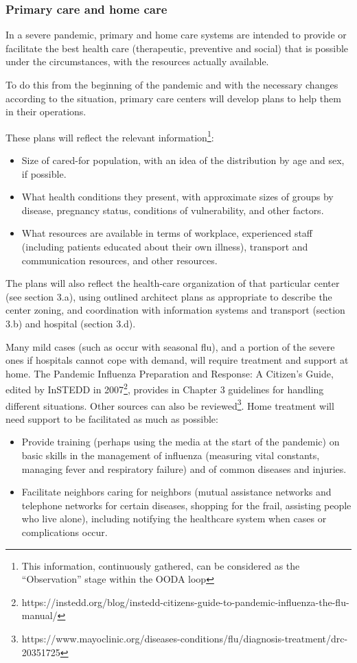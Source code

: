 \documentclass[12pt, a4]{scrartcl}
\begin{document}
\subsubsection{Primary care and home care}
In a severe pandemic, primary and home care systems are intended to provide or facilitate the best health care (therapeutic, preventive and social) that is possible under the circumstances, with the resources actually available.

To do this from the beginning of the pandemic and with the necessary changes according to the situation, primary care centers will develop plans to help them in their operations.

These plans will reflect the relevant information\footnote{This information, continuously gathered, can be considered as the “Observation” stage within the OODA loop}:
\begin{itemize}
	\item Size of cared-for population, with an idea of the distribution by age and sex, if possible.
	\item What health conditions they present, with approximate sizes of groups by disease, pregnancy status, conditions of vulnerability, and other factors.
	\item What resources are available in terms of workplace, experienced staff (including patients educated about their own illness), transport and communication resources, and other resources. 
\end{itemize}

The plans will also reflect the health-care organization of that particular center (see section 3.a), using outlined architect plans as appropriate to describe the center zoning, and coordination with information systems and transport (section 3.b) and hospital (section 3.d). 

Many mild cases (such as occur with seasonal flu), and a portion of the severe ones if hospitals cannot cope with demand, will require treatment and support at home. The Pandemic Influenza Preparation and Response: A Citizen's Guide, edited by InSTEDD in 2007\footnote{https://instedd.org/blog/instedd-citizens-guide-to-pandemic-influenza-the-flu-manual/}, provides in Chapter 3 guidelines for handling different situations. Other sources can also be reviewed\footnote{https://www.mayoclinic.org/diseases-conditions/flu/diagnosis-treatment/drc-20351725}. Home treatment will need support to be facilitated as much as possible:

\begin{itemize}
	\item Provide training (perhaps using the media at the start of the pandemic) on basic skills in the management of influenza (measuring vital constants, managing fever and respiratory failure) and of common diseases and injuries.
	\item Facilitate neighbors caring for neighbors (mutual assistance networks and telephone networks for certain diseases, shopping for the frail, assisting people who live alone), including notifying the healthcare system when cases or complications occur.
\end{itemize}
\end{document}
